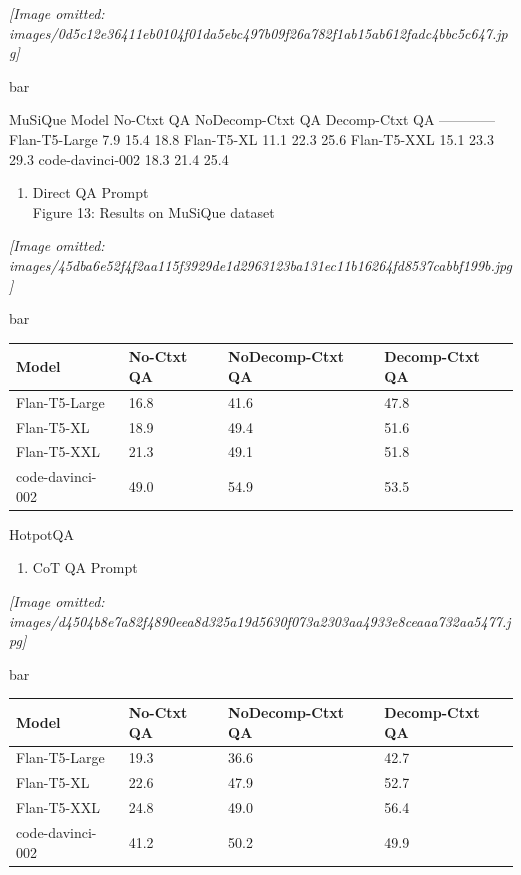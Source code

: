 \documentclass[
]{article}
\newcounter{none} %
\providecommand{\tightlist}{%
  \setlength{\itemsep}{0pt}\setlength{\parskip}{0pt}}
\begin{document}
\textit{[Image omitted: images/0d5c12e36411eb0104f01da5ebc497b09f26a782f1ab15ab612fadc4bbc5c647.jpg]}

bar

MuSiQue \textbar{} Model \textbar{} No-Ctxt QA \textbar{} NoDecomp-Ctxt
QA \textbar{} Decomp-Ctxt QA \textbar{}
\textbar---\textbar---\textbar---\textbar---\textbar{} \textbar{}
Flan-T5-Large \textbar{} 7.9 \textbar{} 15.4 \textbar{} 18.8 \textbar{}
\textbar{} Flan-T5-XL \textbar{} 11.1 \textbar{} 22.3 \textbar{} 25.6
\textbar{} \textbar{} Flan-T5-XXL \textbar{} 15.1 \textbar{} 23.3
\textbar{} 29.3 \textbar{} \textbar{} code-davinci-002 \textbar{} 18.3
\textbar{} 21.4 \textbar{} 25.4 \textbar{}

\begin{enumerate}
\def\labelenumi{(\alph{enumi})}
\setcounter{enumi}{1}
\tightlist
\item
  Direct QA Prompt\\
  Figure 13: Results on MuSiQue dataset
\end{enumerate}

\textit{[Image omitted: images/45dba6e52f4f2aa115f3929de1d2963123ba131ec11b16264fd8537cabbf199b.jpg]}

bar

{\def\LTcaptype{none} %
\begin{longtable}[]{@{}llll@{}}
\toprule\noalign{}
Model & No-Ctxt QA & NoDecomp-Ctxt QA & Decomp-Ctxt QA \\
\midrule\noalign{}
\endhead
\bottomrule\noalign{}
\endlastfoot
Flan-T5-Large & 16.8 & 41.6 & 47.8 \\
Flan-T5-XL & 18.9 & 49.4 & 51.6 \\
Flan-T5-XXL & 21.3 & 49.1 & 51.8 \\
code-davinci-002 & 49.0 & 54.9 & 53.5 \\
\end{longtable}
}

HotpotQA

\begin{enumerate}
\def\labelenumi{(\alph{enumi})}
\tightlist
\item
  CoT QA Prompt
\end{enumerate}

\textit{[Image omitted: images/d4504b8e7a82f4890eea8d325a19d5630f073a2303aa4933e8ceaaa732aa5477.jpg]}

bar

{\def\LTcaptype{none} %
\begin{longtable}[]{@{}llll@{}}
\toprule\noalign{}
Model & No-Ctxt QA & NoDecomp-Ctxt QA & Decomp-Ctxt QA \\
\midrule\noalign{}
\endhead
\bottomrule\noalign{}
\endlastfoot
Flan-T5-Large & 19.3 & 36.6 & 42.7 \\
Flan-T5-XL & 22.6 & 47.9 & 52.7 \\
Flan-T5-XXL & 24.8 & 49.0 & 56.4 \\
code-davinci-002 & 41.2 & 50.2 & 49.9 \\
\end{longtable}
}
\end{document}
